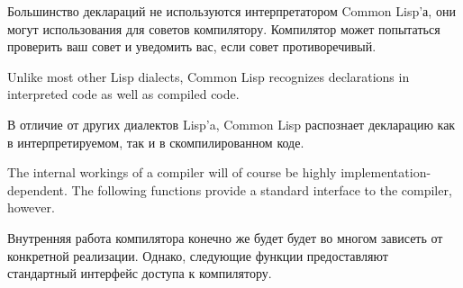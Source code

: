 Большинство деклараций не используются интерпретатором Common Lisp'а, они могут
использования для советов компилятору. Компилятор может попытаться проверить
ваш совет и уведомить вас, если совет противоречивый.

Unlike most other Lisp dialects, Common Lisp recognizes 
declarations in interpreted code as well as compiled code.

В отличие от других диалектов Lisp'a, Common Lisp распознает декларацию
 как в интерпретируемом, так и в скомпилированном коде.

The internal workings of a compiler will of course be highly
implementation-dependent.  The following functions provide a standard
interface to the compiler, however.

Внутренняя работа компилятора конечно же будет будет во многом зависеть от
конкретной реализации. Однако, следующие функции предоставляют стандартный
интерфейс доступа к компилятору.

